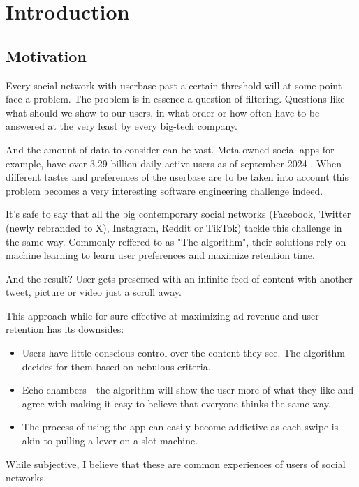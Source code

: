 \chapter*{Introduction}

\section*{Motivation}

Every social network with userbase past a certain threshold will at some point face a problem.
The problem is in essence a question of filtering.
Questions like what should we show to our users, in what order or how often have to be answered at the very least by every big-tech company.

And the amount of data to consider can be vast.
Meta-owned social apps for example, have over 3.29 billion daily active users as of september 2024 \cite{metaDau2024}.
When different tastes and preferences of the userbase are to be taken into account
this problem becomes a very interesting software engineering challenge indeed.

It's safe to say that all the big contemporary social networks (Facebook, Twitter (newly rebranded to X), Instagram, Reddit or TikTok)
tackle this challenge in the same way.
Commonly reffered to as "The algorithm",
their solutions rely on machine learning to learn user preferences and maximize retention time.

And the result? User gets presented with an infinite feed of content
with another tweet, picture or video just a scroll away.

This approach while for sure effective at maximizing ad revenue and user retention has its downsides:
\begin{itemize}
  \item Users have little conscious control over the content they see. The algorithm decides for them based on nebulous criteria.
  \item Echo chambers - the algorithm will show the user more of what they like and agree with making it easy to believe that
  everyone thinks the same way.
  \item The process of using the app can easily become addictive as each swipe is akin to pulling a lever on a slot machine.
\end{itemize}
While subjective, I believe that these are common experiences of users of social networks.

